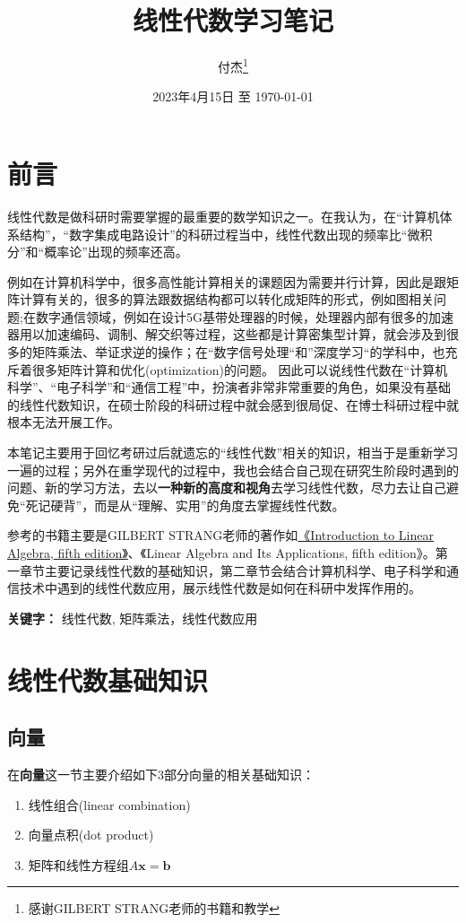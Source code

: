 \documentclass{book}
\title{线性代数学习笔记}
\author{付杰\thanks{感谢GILBERT STRANG老师的书籍和教学}}
\date{2023年4月15日 至 \today}
\begin{document}
\maketitle
\newpage

\chapter*{前言} %
线性代数是做科研时需要掌握的最重要的数学知识之一。在我认为，在“计算机体系结构”，“数字集成电路设计”的科研过程当中，线性代数出现的频率比“微积分”和“概率论”出现的频率还高。

例如在计算机科学中，很多高性能计算相关的课题因为需要并行计算，因此是跟矩阵计算有关的，很多的算法跟数据结构都可以转化成矩阵的形式，例如图相关问题;在数字通信领域，例如在设计5G基带处理器的时候，处理器内部有很多的加速器用以加速编码、调制、解交织等过程，这些都是计算密集型计算，就会涉及到很多的矩阵乘法、举证求逆的操作；在“数字信号处理“和”深度学习“的学科中，也充斥着很多矩阵计算和优化(optimization)的问题。
因此可以说线性代数在“计算机科学”、“电子科学”和“通信工程”中，扮演者非常非常重要的角色，如果没有基础的线性代数知识，在硕士阶段的科研过程中就会感到很局促、在博士科研过程中就根本无法开展工作。

本笔记主要用于回忆考研过后就遗忘的“线性代数”相关的知识，相当于是重新学习一遍的过程；另外在重学现代的过程中，我也会结合自己现在研究生阶段时遇到的问题、新的学习方法，去以\textbf{一种新的高度和视角}去学习线性代数，尽力去让自己避免“死记硬背”，而是从“理解、实用”的角度去掌握线性代数。

  参考的书籍主要是GILBERT STRANG老师的著作如\href{https://math.mit.edu/~gs/linearalgebra/ila5/indexila5.html}{《Introduction to Linear Algebra, fifth edition》}、《Linear Algebra and Its Applications, fifth edition》。第一章节主要记录线性代数的基础知识，第二章节会结合计算机科学、电子科学和通信技术中遇到的线性代数应用，展示线性代数是如何在科研中发挥作用的。
  \par\textbf{关键字：} 线性代数, 矩阵乘法，线性代数应用

\tableofcontents %
\chapter{线性代数基础知识} %
\label{cha: chapter1}

\section{向量}%
在\textbf{向量}这一节主要介绍如下3部分向量的相关基础知识：
\begin{enumerate}
  \item 线性组合(linear combination)
  \item 向量点积(dot product)
  \item 矩阵和线性方程组$A\boldsymbol{x}=\boldsymbol{b}$
\end{enumerate}
\end{document}
